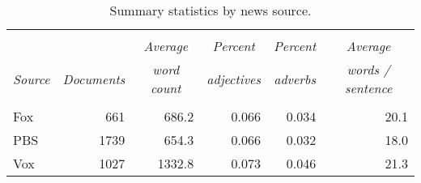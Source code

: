 \begin{table}[H]
    \caption{Summary statistics by news source. }
    \label{tab:summary}
    \centering
    \begin{tabular}{l|r|r|r|r|r} \hline \hline
             &                                &                                 &                                       &                                        &                                            \\
             &                                & \multicolumn{1}{c|}{\textit{Average}}        &   \multicolumn{1}{c|}{\textit{Percent}}            &  \multicolumn{1}{c|}{\textit{Percent}}      & \multicolumn{1}{c}{\textit{Average}}             \\
    \textit{Source}   & \multicolumn{1}{c|}{\textit{Documents}} & \multicolumn{1}{c|}{\textit{word count}} & \multicolumn{1}{c|}{\textit{adjectives}}   & \multicolumn{1}{c|}{\textit{adverbs}}       & \multicolumn{1}{c}{\textit{words / sentence}}          \\ \hline 
             &                                &                                 &                                       &                                        &                                            \\
    Fox      & 661                            & 686.2                           & 0.066                                 & 0.034                                  & 20.1                                       \\
    PBS      & 1739                           & 654.3                           & 0.066                                 & 0.032                                  & 18.0                                       \\
    Vox      & 1027                           & 1332.8                          & 0.073                                 & 0.046                                  & 21.3                                       \\ \hline  
    \end{tabular}
\end{table}